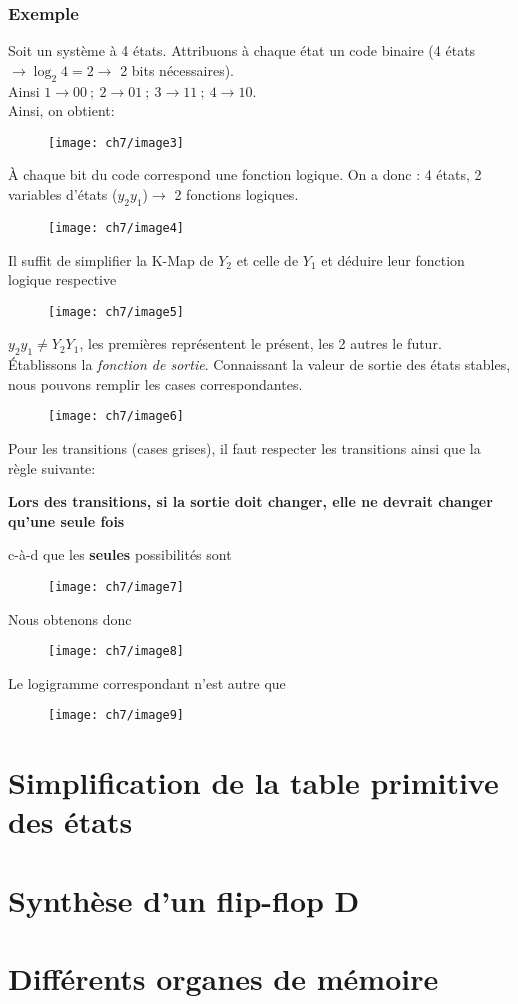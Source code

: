 \subsubsection{Exemple}
Soit un système à 4 états. Attribuons à chaque état un code binaire (4 états $\rightarrow \log_2 4=2\rightarrow$ 2 bits nécessaires).\\
Ainsi $1\rightarrow 00\ ;\ 2\rightarrow 01\ ;\ 3\rightarrow 11\ ;\ 4\rightarrow 10$.\\
Ainsi, on obtient:
\begin{figure}[H]
	\centering
	\texttt{[image: ch7/image3]}
\end{figure}
À chaque bit du code correspond une fonction logique. On a donc : 4 états, 2 variables d'états ($y_2y_1$)$\rightarrow$ 2 fonctions logiques.
\begin{figure}[H]
	\centering
	\texttt{[image: ch7/image4]}
\end{figure}
Il suffit de simplifier la K-Map de $Y_2$ et celle de $Y_1$ et déduire leur fonction logique respective
\begin{figure}[H]
	\centering
	\texttt{[image: ch7/image5]}
\end{figure}
\danger $y_2y_1\neq Y_2Y_1$, les premières représentent le présent, les 2 autres le futur.\\

Établissons la \textit{fonction de sortie}. Connaissant la valeur de sortie des états stables, nous pouvons remplir les cases correspondantes.
\begin{figure}[H]
	\centering
	\texttt{[image: ch7/image6]}
\end{figure} Pour les transitions (cases grises), il faut respecter les transitions ainsi que la règle suivante:
\begin{center}
	\textbf{Lors des transitions, si la sortie doit changer, elle ne devrait changer qu'une seule fois}
\end{center}
c-à-d que les \textbf{seules} possibilités sont
\begin{figure}[H]
	\centering
	\texttt{[image: ch7/image7]}
\end{figure}
Nous obtenons donc
\begin{figure}[H]
	\centering
	\texttt{[image: ch7/image8]}
\end{figure}
Le logigramme correspondant n'est autre que
\begin{figure}[H]
	\centering
	\texttt{[image: ch7/image9]}
\end{figure}
\section{Simplification de la table primitive des états}

\section{Synthèse d'un flip-flop D}

\section{Différents organes de mémoire}